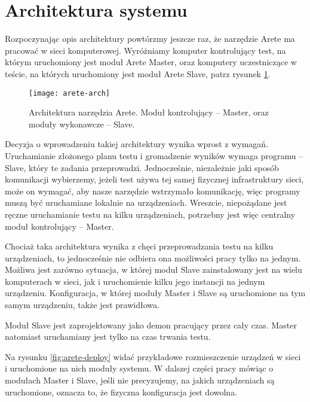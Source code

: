 \documentclass[00-praca-magisterska.tex]{subfiles}
\begin{document}
\section{Architektura systemu}
\label{arete-architektura}

Rozpoczynając opis architektury powtórzmy jeszcze raz, że narzędzie Arete ma
pracować w sieci komputerowej. Wyróżniamy komputer kontrolujący test, na którym
uruchomiony jest moduł Arete Master, oraz komputery uczestniczące w teście, na
których uruchomiony jest moduł Arete Slave, patrz rysunek \ref{fig:arete-arch}.

\begin{figure}
\begin{center}
\leavevmode
\texttt{[image: arete-arch]}
\end{center}
\caption{Architektura narzędzia Arete. Moduł kontrolujący -- Master, oraz
moduły wykonawcze -- Slave.}
\label{fig:arete-arch}
\end{figure}

Decyzja o wprowadzeniu takiej architektury wynika wprost z wymagań.
Uruchamianie złożonego planu testu i gromadzenie wyników wymaga programu --
Slave, który te zadania przeprowadzi. Jednocześnie, niezależnie jaki sposób
komunikacji wybierzemy, jeżeli test używa tej samej fizycznej infrastruktury
sieci, może on wymagać, aby nasze narzędzie wstrzymało komunikację, więc
programy muszą być uruchamiane lokalnie na urządzeniach. Wreszcie, niepożądane
jest ręczne uruchamianie testu na kilku urządzeniach, potrzebny jest więc
centralny moduł kontrolujący -- Master.

Chociaż taka architektura wynika z chęci przeprowadzania testu na kilku
urządzeniach, to jednocześnie nie odbiera ona możliwości pracy tylko na jednym.
Możliwa jest zarówno sytuacja, w której moduł Slave zainstalowany jest na
wielu komputerach w sieci, jak i uruchomienie kilku jego instancji na
jednym urządzeniu. Konfiguracja, w której moduły Master i Slave są uruchomione
na tym samym urządzeniu, także jest prawidłowa.

Moduł Slave jest zaprojektowany jako demon pracujący przez cały czas. Master
natomiast uruchamiany jest tylko na czas trwania testu.

Na rysunku \ref{fig:arete-deploy} widać przykładowe rozmieszczenie urządzeń w
sieci i uruchomione na nich moduły systemu. W dalszej części pracy mówiąc o
modułach Master i Slave, jeśli nie precyzujemy, na jakich urządzeniach są
uruchomione, oznacza to, że fizyczna konfiguracja jest dowolna.
\end{document}

